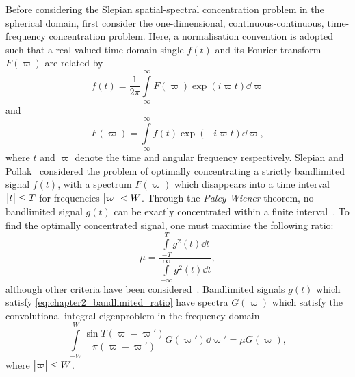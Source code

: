 Before considering the Slepian spatial-spectral concentration problem in the spherical domain, first consider the one-dimensional, continuous-continuous, time-frequency concentration problem.
Here, a normalisation convention is adopted such that a real-valued time-domain single \(f(t)\) and its Fourier transform \(F(\varpi)\) are related by
%
\begin{equation}
	f(t)
	= \frac{1}{2\pi} \displaystyle\int\limits_{\infty}^{\infty} F(\varpi) \exp(i\varpi t) \dd{\varpi}
\end{equation}
%
and
%
\begin{equation}
	F(\varpi)
	= \displaystyle\int\limits_{\infty}^{\infty} f(t) \exp(-i\varpi t) \dd{\varpi},
\end{equation}
%
where \(t\) and \(\varpi{}\) denote the time and angular frequency respectively.
Slepian and Pollak~\cite{Slepian1961} considered the problem of optimally concentrating a strictly bandlimited signal \(f(t)\), with a spectrum \(F(\varpi)\) which disappears into a time interval \(\big\lvert t\big\rvert \leq T\) for frequencies \(\big\lvert\varpi\big\rvert < W\).
Through the \emph{Paley-Wiener} theorem, no bandlimited signal \(g(t)\) can be exactly concentrated within a finite interval~\cite{Daubechies1992,Mallat2008}.
To find the optimally concentrated signal, one must maximise the following ratio:
%
\begin{equation}\label{eq:chapter2_bandlimited_ratio}
	\mu
	= \frac{\displaystyle\int\limits_{-T}^{T} g^{2}(t) \dd{t}}
	{\displaystyle\int\limits_{-\infty}^{\infty} g^{2}(t) \dd{t}},
\end{equation}
%
although other criteria have been considered~\cite{Freeden1997,Riedel1995}.
Bandlimited signals \(g(t)\) which satisfy \cref{eq:chapter2_bandlimited_ratio} have spectra \(G(\varpi)\) which satisfy the convolutional integral eigenproblem in the frequency-domain
%
\begin{equation}
	\displaystyle\int\limits_{-W}^{W} \frac{\sin T(\varpi-\varpi')}{\pi(\varpi-\varpi')} G(\varpi') \dd{\varpi'}
	= \mu G(\varpi),
\end{equation}
%
where \(\big\lvert\varpi\big\rvert \leq W\).

